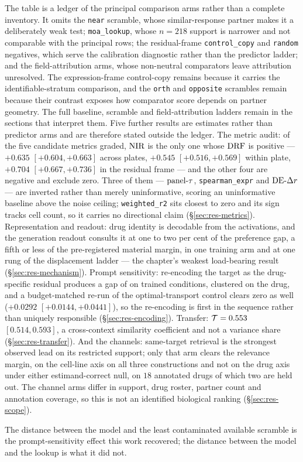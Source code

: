 The table is a ledger of the principal comparison arms rather than a complete inventory. It omits
the \texttt{near} scramble, whose similar-response partner makes it a deliberately weak test;
\texttt{moa\_lookup}, whose $n=218$ support is narrower and not comparable with the principal rows;
the residual-frame \texttt{control\_copy} and \texttt{random} negatives, which serve the calibration
diagnostic rather than the predictor ladder; and the field-attribution arms, whose non-neutral
comparators leave attribution unresolved. The expression-frame control-copy remains because it
carries the identifiable-stratum comparison, and the \texttt{orth} and \texttt{opposite} scrambles
remain because their contrast exposes how comparator score depends on partner geometry. The full baseline, scramble and
field-attribution ladders remain in the sections that interpret them. Five further
results are estimates rather than predictor arms and are therefore stated outside the ledger. The metric audit: of the
five candidate metrics graded, $\textrm{NIR}$ is the only one whose $\textrm{DRF}$ is positive --- $+0.635$
\nolinebreak[3]$[+0.604, +0.663]$ across plates, $+0.545$ \nolinebreak[3]$[+0.516, +0.569]$ within
plate, $+0.704$ \nolinebreak[3]$[+0.667, +0.736]$ in the residual frame --- and the other four are
negative and exclude zero. Three of them --- $\textrm{panel-}\tau$, \texttt{spearman\_expr} and $\textrm{DE-}\Delta r$ ---
are inverted rather than merely uninformative, scoring an uninformative baseline above the noise
ceiling; \texttt{weighted\_r2} sits closest to zero and its sign tracks cell count, so it carries no
directional claim (\S\ref{sec:res-metrics}). Representation and readout: drug identity is decodable from the
activations, and the generation readout consults it at one to two per cent of the preference gap, a
fifth or less of the pre-registered material margin, in one training arm and at one rung of the
displacement ladder --- the chapter's weakest load-bearing result (\S\ref{sec:res-mechanism}). Prompt sensitivity:
re-encoding the target as the drug-specific residual produces a gap of
 on trained conditions, clustered on the drug, and a budget-matched
re-run of the optimal-transport control clears zero as well
($+0.0292$ \nolinebreak[3]$[+0.0144, +0.0441]$), so the re-encoding is first in the sequence rather
than uniquely responsible (\S\ref{sec:res-encoding}). Transfer: $\mathcal{T} = 0.553$
\nolinebreak[3]$[0.514, 0.593]$, a cross-context similarity coefficient and not a variance share
(\S\ref{sec:res-transfer}). And the channels: same-target retrieval is the strongest observed lead
on its restricted support; only that arm clears the relevance margin, on the cell-line axis on all
three constructions and not on the drug axis under either estimand-correct null, on $18$ annotated
drugs of which two are held out. The channel arms differ in support, drug roster, partner count and
annotation coverage, so this is not an identified biological ranking (\S\ref{sec:res-scope}).

The distance between the model and the least contaminated available scramble is the prompt-sensitivity
effect this work recovered; the
distance between the model and the lookup is what it did not.
